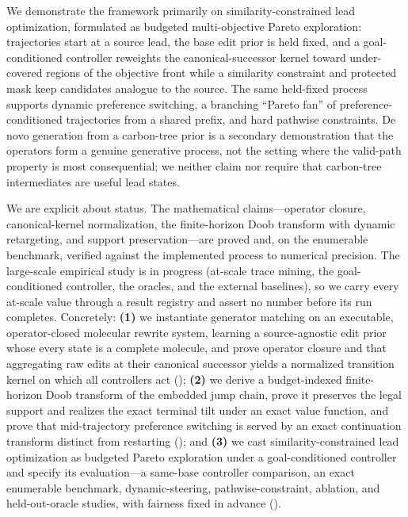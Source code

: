 We demonstrate the framework primarily on similarity-constrained lead optimization, formulated as
budgeted multi-objective Pareto exploration: trajectories start at a source lead, the base edit prior is
held fixed, and a goal-conditioned controller reweights the canonical-successor kernel toward
under-covered regions of the objective front while a similarity constraint and protected mask keep
candidates analogue to the source. The same held-fixed process supports dynamic preference switching, a
branching ``Pareto fan'' of preference-conditioned trajectories from a shared prefix, and hard pathwise
constraints. De novo generation from a carbon-tree prior is a secondary demonstration that the operators
form a genuine generative process, not the setting where the valid-path property is most consequential;
we neither claim nor require that carbon-tree intermediates are useful lead states.

We are explicit about status. The mathematical claims---operator closure, canonical-kernel
normalization, the finite-horizon Doob transform with dynamic retargeting, and support preservation---are
proved and, on the enumerable benchmark, verified against the implemented process to numerical precision.
The large-scale empirical study is in progress (at-scale trace mining, the goal-conditioned controller,
the oracles, and the external baselines), so we carry every at-scale value through a result registry and
assert no number before its run completes. Concretely: \textbf{(1)} we instantiate generator matching on an
executable, operator-closed molecular rewrite system, learning a source-agnostic edit prior whose every
state is a complete molecule, and prove operator closure and that aggregating raw edits at their
canonical successor yields a normalized transition kernel on which all controllers act
(); \textbf{(2)} we derive a budget-indexed finite-horizon Doob transform of
the embedded jump chain, prove it preserves the legal support and realizes the exact terminal tilt under
an exact value function, and prove that mid-trajectory preference switching is served by an exact
continuation transform distinct from restarting (); and \textbf{(3)} we
cast similarity-constrained lead optimization as budgeted Pareto exploration under a goal-conditioned
controller and specify its evaluation---a same-base controller comparison, an exact enumerable benchmark,
dynamic-steering, pathwise-constraint, ablation, and held-out-oracle studies, with fairness fixed in
advance ().
